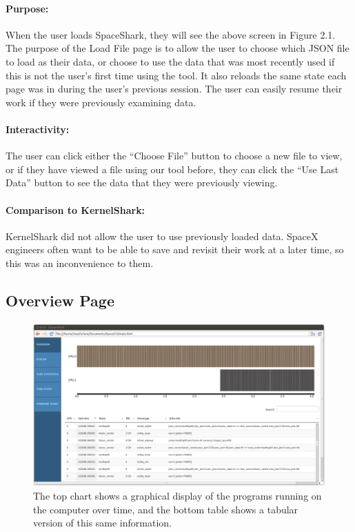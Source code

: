 \documentclass{hmcclinic}
\begin{document}
\paragraph{Purpose:}
When the user loads SpaceShark, they will see the above screen in Figure
2.1. The purpose of the Load File page is to allow the user to choose which JSON file to load as their data, 
or choose to use the data that was most recently used if this is not the user's first time using 
the tool. It also reloads the same state each page was in during
the user's previous session. The user can easily resume their work if they were previously examining data.

\paragraph{Interactivity:}
The user can click either the ``Choose File'' button to choose a new file to view, or if they have viewed a file using our tool before, they can click the ``Use Last Data'' button to see the data that they were previously viewing.

\paragraph{Comparison to KernelShark:}
KernelShark did not allow the user to use previously loaded data. SpaceX engineers often want to be able to save and revisit their work at a later time, so this was an inconvenience to them. 


  \subsection{Overview Page} 
  
  \begin{figure}[H]
  \centering
      \includegraphics[width=5in]{overview-page.png}
  \caption{The top chart shows a graphical display of the programs running on the computer over time, and the bottom table shows a tabular version of this same information.}
  \end{figure}
\end{document}
